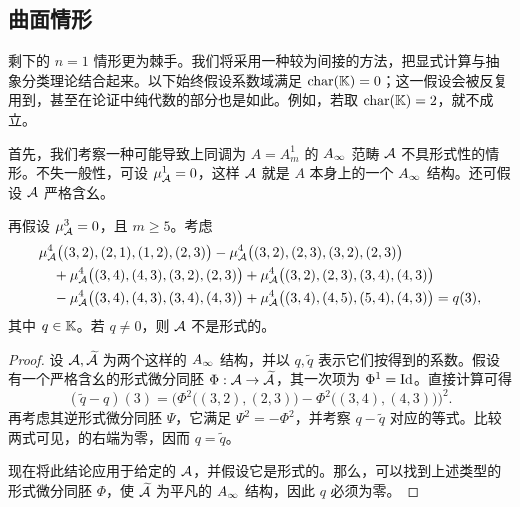 \subsection{曲面情形}\label{sec:20c}
剩下的 $n=1$ 情形更为棘手。我们将采用一种较为间接的方法，把显式计算与抽象分类理论结合起来。以下始终假设系数域满足 $\operatorname{char}(\mathbb K)=0$；这一假设会被反复用到，甚至在论证中纯代数的部分也是如此。例如，若取 $\operatorname{char}(\mathbb K)=2$，就不成立。

首先，我们考察一种可能导致上同调为 $A=A_m^1$ 的 $A_\infty$ 范畴 $\mathcal A$ 不具形式性的情形。不失一般性，可设 $\mu_{\mathcal A}^1=0$，这样 $\mathcal A$ 就是 $A$ 本身上的一个 $A_\infty$ 结构。还可假设 $\mathcal A$ 严格含幺。
\begin{lemma}\label{st:20.1}
再假设 $\mu_{\mathcal A}^3=0$，且 $m\ge5$。考虑
\begin{equation}\label{eq:20.8}
\begin{aligned}
&\mu_{\mathcal A}^4\bigl((3,2),(2,1),(1,2),(2,3)\bigr)
 -\mu_{\mathcal A}^4\bigl((3,2),(2,3),(3,2),(2,3)\bigr)\\
&\quad+\mu_{\mathcal A}^4\bigl((3,4),(4,3),(3,2),(2,3)\bigr)
 +\mu_{\mathcal A}^4\bigl((3,2),(2,3),(3,4),(4,3)\bigr)\\
&\quad-\mu_{\mathcal A}^4\bigl((3,4),(4,3),(3,4),(4,3)\bigr)
 +\mu_{\mathcal A}^4\bigl((3,4),(4,5),(5,4),(4,3)\bigr)=q(3),
\end{aligned}
\end{equation}
其中 $q\in\mathbb K$。若 $q\ne0$，则 $\mathcal A$ 不是形式的。
\end{lemma}
\begin{proof}
设 $\mathcal A,\widetilde{\mathcal A}$ 为两个这样的 $A_\infty$ 结构，并以 $q,\widetilde q$ 表示它们按得到的系数。假设有一个严格含幺的形式微分同胚 $\Phi:\mathcal A\to\widetilde{\mathcal A}$，其一次项为 $\Phi^1=\operatorname{Id}$。直接计算可得
\begin{equation}\label{eq:20.9}
(\widetilde q-q)(3)=
\bigl(\Phi^2\bigl((3,2),(2,3)\bigr)-\Phi^2\bigl((3,4),(4,3)\bigr)\bigr)^2.
\end{equation}
再考虑其逆形式微分同胚 $\Psi$，它满足 $\Psi^2=-\Phi^2$，并考察 $q-\widetilde q$ 对应的等式。比较两式可见，的右端为零，因而 $q=\widetilde q$。

现在将此结论应用于给定的 $\mathcal A$，并假设它是形式的。那么，可以找到上述类型的形式微分同胚 $\Phi$，使 $\widetilde{\mathcal A}$ 为平凡的 $A_\infty$ 结构，因此 $q$ 必须为零。
\end{proof}
